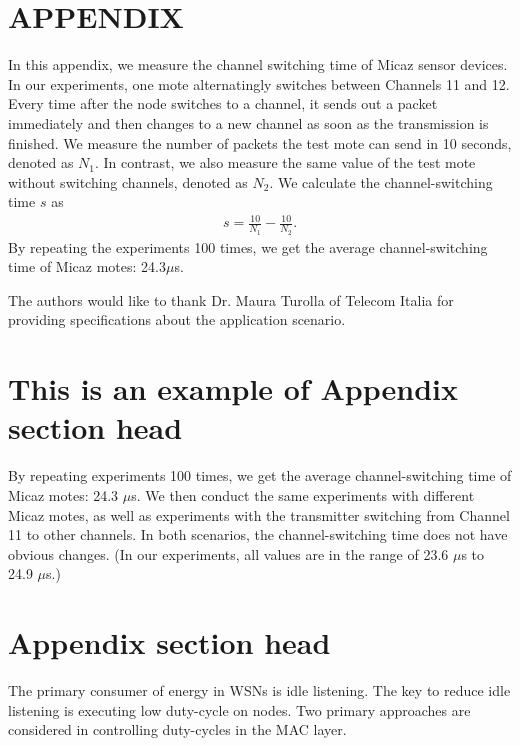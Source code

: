 \documentclass[prodmode,acmtecs]{acmsmall}
\begin{document}
\appendix
\section*{APPENDIX}
\setcounter{section}{1}
In this appendix, we measure
the channel switching time of Micaz \cite{CROSSBOW} sensor devices.
In our experiments, one mote alternatingly switches between Channels
11 and 12. Every time after the node switches to a channel, it sends
out a packet immediately and then changes to a new channel as soon
as the transmission is finished. We measure the
number of packets the test mote can send in 10 seconds, denoted as
$N_{1}$. In contrast, we also measure the same value of the test
mote without switching channels, denoted as $N_{2}$. We calculate
the channel-switching time $s$ as
\begin{eqnarray}%
s=\frac{10}{N_{1}}-\frac{10}{N_{2}}. \nonumber
\end{eqnarray}%
By repeating the experiments 100 times, we get the average
channel-switching time of Micaz motes: 24.3$\mu$s.


\begin{acks}
The authors would like to thank Dr. Maura Turolla of Telecom
Italia for providing specifications about the application scenario.
\end{acks}





\elecappendix

\medskip

\section{This is an example of Appendix section head}

By repeating experiments 100 times, we get the average
channel-switching time of Micaz motes: 24.3 $\mu$s. We then conduct
the same experiments with different Micaz motes, as well as
experiments with the transmitter switching from Channel 11 to other
channels. In both scenarios, the channel-switching time does not have
obvious changes. (In our experiments, all values are in the range of
23.6 $\mu$s to 24.9 $\mu$s.)

\section{Appendix section head}

The primary consumer of energy in WSNs is idle listening. The key to
reduce idle listening is executing low duty-cycle on nodes. Two
primary approaches are considered in controlling duty-cycles in the
MAC layer.
\end{document}
